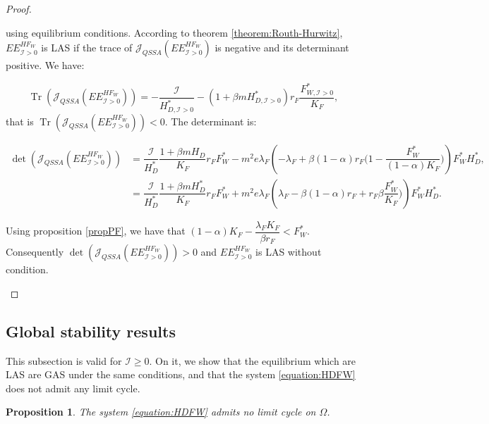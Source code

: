 \documentclass{article}
\newcommand{\lfw}{\lambda_{F}}
\newcommand{\lfw}{\lambda_{F}}
\newcommand{\cI}{\mathcal{I}}
\DeclareMathOperator{\Tr}{Tr}
\newtheorem{prop}{Proposition}
\begin{document}
\begin{proof}
\begin{itemize}
using equilibrium conditions.  According to theorem \ref{theorem:Routh-Hurwitz},  $EE^{HF_W}_{\cI > 0}$ is LAS if the trace of $\mathcal{J}_{QSSA}(EE^{HF_W}_{\cI > 0}) $ is negative and its determinant positive. We have:

\begin{equation*}
\Tr(\mathcal{J}_{QSSA}(EE^{HF_W}_{\cI > 0})) = -\dfrac{\cI}{H^*_{D, \cI > 0}} -(1+\beta m H^*_{D, \cI > 0}) r_F \dfrac{F^*_{W, \cI > 0}}{K_F}, 
\end{equation*}
that is $\Tr(\mathcal{J}_{QSSA}(EE^{HF_W}_{\cI > 0})) < 0$.
The determinant is:

\begin{align*}
\det(\mathcal{J}_{QSSA}(EE^{HF_W}_{\cI > 0})) &= \dfrac{\cI}{H_D^*} \dfrac{1 + \beta m H_D}{K_F} r_F F_W^* - m^2 e \lfw \left(-\lfw + \beta(1-\alpha)r_F \Big(1- \dfrac{F_W^*}{(1-\alpha) K_F} \Big) \right) F_W^* H_D^*, \\
&= \dfrac{\cI}{H_D^*} \dfrac{1 + \beta m H_D^*}{K_F} r_F F_W^* + m^2 e \lfw \left(\lfw - \beta(1-\alpha)r_F + r_F \beta\dfrac{F_W^*}{ K_F} \Big) \right) F_W^* H_D^*.
\end{align*}

Using proposition \ref{propPF}, we have that $(1-\alpha)K_F - \dfrac{\lfw K_F}{\beta r_F} < F_W^*$. Consequently $\det(\mathcal{J}_{QSSA}(EE^{HF_W}_{\cI > 0})) > 0$ and $EE^{HF_W}_{\cI > 0}$ is LAS without condition.
\end{itemize}
\end{proof}

\subsection{Global stability results}
This subsection is valid for $\cI \geq 0$. On it, we show that the equilibrium which are LAS are GAS under the same conditions, and that the system \eqref{equation:HDFW} does not admit any limit cycle. 

\begin{prop}
The system \eqref{equation:HDFW} admits no limit cycle on $\Omega$.
\end{prop}
\end{document}
